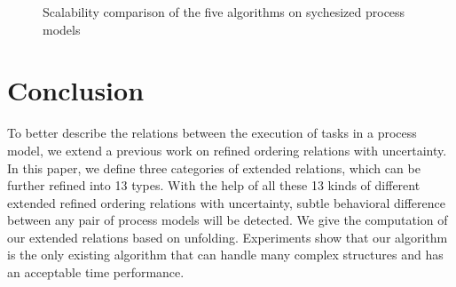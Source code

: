 \documentclass{llncs}
\begin{document}
\begin{figure}[htbp]
\centering
{}
\caption[Scalability comparison of five algorithms]{Scalability comparison of the five algorithms on sychesized process models \label{fig:scalability}}
\end{figure}

\section{Conclusion}\label{sec:conclusion}
To better describe the relations between the execution of tasks in a process model, we extend a previous work on refined ordering relations with uncertainty. In this paper, we define three categories of extended relations, which can be further refined into 13 types. With the help of all these 13 kinds of different extended refined ordering relations with uncertainty, subtle behavioral difference between any pair of process models will be detected. We give the computation of our extended relations based on unfolding. Experiments show that our algorithm is the only existing algorithm that can handle many complex structures and has an acceptable time performance.
\end{document}
